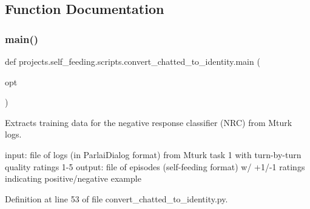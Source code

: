 \subsection{Function Documentation}
\mbox{\label{namespaceprojects_1_1self__feeding_1_1scripts_1_1convert__chatted__to__identity_ac409d1c26364c39762dd2357afdaf64a}} 
\subsubsection{\texorpdfstring{main()}{main()}}
{\footnotesize\ttfamily def projects.\+self\+\_\+feeding.\+scripts.\+convert\+\_\+chatted\+\_\+to\+\_\+identity.\+main (\begin{DoxyParamCaption}\item[{}]{opt }\end{DoxyParamCaption})}

\begin{DoxyVerb}Extracts training data for the negative response classifier (NRC) from Mturk logs.

input: file of logs (in ParlaiDialog format) from Mturk task 1 with turn-by-turn
    quality ratings 1-5
output: file of episodes (self-feeding format) w/ +1/-1 ratings indicating
    positive/negative example
\end{DoxyVerb}
 

Definition at line 53 of file convert\+\_\+chatted\+\_\+to\+\_\+identity.\+py.


